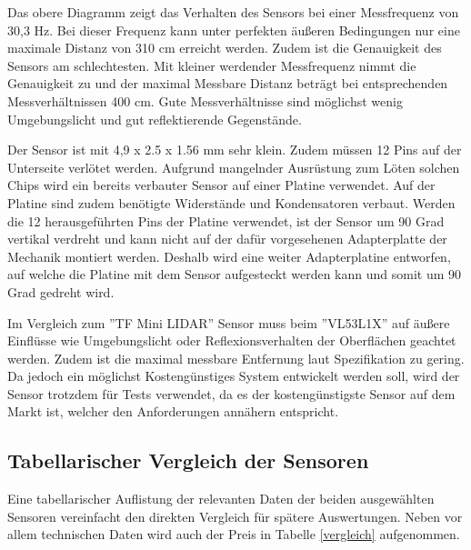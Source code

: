 Das obere Diagramm zeigt das Verhalten des Sensors bei einer Messfrequenz von 30,3 Hz. Bei dieser Frequenz kann unter perfekten äußeren Bedingungen nur eine maximale Distanz von 310 cm erreicht werden. Zudem ist die Genauigkeit des Sensors am schlechtesten. Mit kleiner werdender Messfrequenz nimmt die Genauigkeit zu und der maximal Messbare Distanz beträgt bei entsprechenden Messverhältnissen 400 cm. Gute Messverhältnisse sind möglichst wenig Umgebungslicht und gut reflektierende Gegenstände. \cite{VL53L1X_manual}


Der Sensor ist mit 4,9 x 2.5 x 1.56 mm sehr klein. Zudem müssen 12 Pins auf der Unterseite verlötet werden. Aufgrund mangelnder Ausrüstung zum Löten solchen Chips wird ein bereits verbauter Sensor auf einer Platine verwendet. Auf der Platine sind zudem benötigte Widerstände und Kondensatoren verbaut. Werden die 12 herausgeführten Pins der Platine verwendet, ist der Sensor um 90 Grad vertikal verdreht und kann nicht auf der dafür vorgesehenen Adapterplatte der Mechanik montiert werden. Deshalb wird eine weiter Adapterplatine entworfen, auf welche die Platine mit dem Sensor aufgesteckt werden kann und somit um 90 Grad gedreht wird.





Im Vergleich zum ''TF Mini LIDAR'' Sensor muss beim ''VL53L1X'' auf äußere Einflüsse wie Umgebungslicht oder Reflexionsverhalten der Oberflächen geachtet werden. Zudem ist die maximal messbare Entfernung laut Spezifikation zu gering. Da jedoch ein möglichst Kostengünstiges System entwickelt werden soll, wird der Sensor trotzdem für Tests verwendet, da es der kostengünstigste Sensor auf dem Markt ist, welcher den Anforderungen annähern entspricht.



\subsection{Tabellarischer Vergleich der Sensoren}

Eine tabellarischer Auflistung der relevanten Daten der beiden ausgewählten Sensoren vereinfacht den direkten Vergleich für spätere Auswertungen. Neben vor allem technischen Daten wird auch der Preis in Tabelle \ref{vergleich} aufgenommen.

